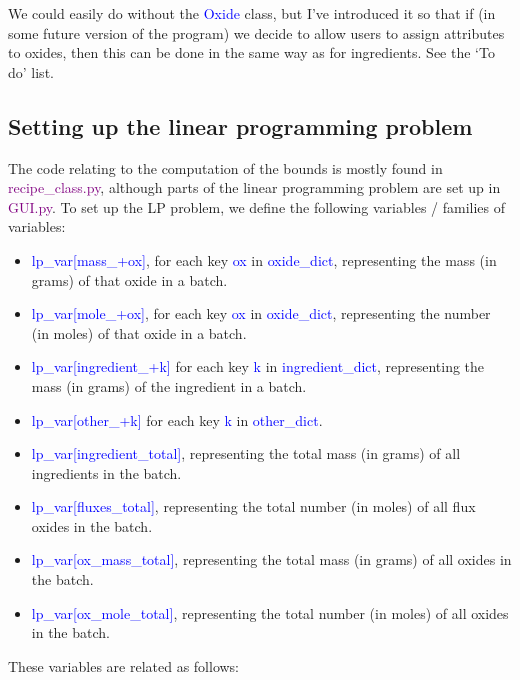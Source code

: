 \documentclass[a4paper,10pt]{article}
\def\'{\textquotesingle}
\def\blue{\textcolor{blue}}
\def\green{\textcolor{Purple}}
\def\lpv{lp\_var}
\begin{document}
We could easily do without the \blue{Oxide} class, but I've introduced it so that if (in some future version of the program) we decide to allow users to assign attributes to oxides, then this can be done in the same way as for ingredients. See the `To do' list.

\subsection{Setting up the linear programming problem}
The code relating to the computation of the bounds is mostly found in \newline
\green{recipe\_class.py}, although parts of the linear programming problem are set up in \green{GUI.py}. To set up the LP problem, we define the following variables / families of variables:
\begin{itemize}
\item \blue{\lpv[\'mass\_\'+ox]}, for each key \blue{ox} in \blue{oxide\_dict}, representing the mass (in grams) of that oxide in a batch.
\item \blue{\lpv[\'mole\_\'+ox]}, for each key \blue{ox} in \blue{oxide\_dict}, representing the number (in moles) of that oxide in a batch.
\item \blue{\lpv[\'ingredient\_\'+k]} for each key \blue{k} in \blue{ingredient\_dict}, representing the mass (in grams) of the ingredient in a batch.
\item \blue{\lpv[\'other\_\'+k]} for each key \blue{k} in \blue{other\_dict}. 
\item \blue{\lpv[\'ingredient\_total\']}, representing the total mass (in grams) of all ingredients in the batch.
\item \blue{\lpv[\'fluxes\_total\']}, representing the total number (in moles) of all flux oxides in the batch.
\item \blue{\lpv[\'ox\_mass\_total\']}, representing the total mass (in grams) of all oxides in the batch.
\item \blue{\lpv[\'ox\_mole\_total\']}, representing the total number (in moles) of all oxides in the batch.
\end{itemize}
%
These variables are related as follows:
%
\end{document}
